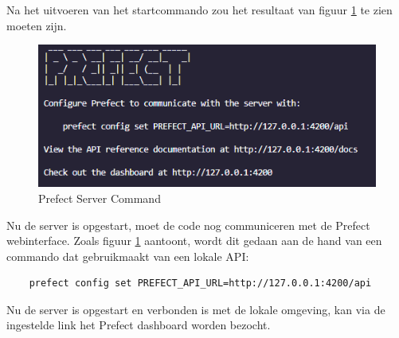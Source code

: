 Na het uitvoeren van het startcommando zou het resultaat van figuur \ref{fig:Prefect_server} te zien moeten zijn.
\begin{figure}[htbp]
    \centering
    \includegraphics[width=0.9\linewidth]{graphics/Prefect_server.PNG}
    \caption{Prefect Server Command}
    \label{fig:Prefect_server}
\end{figure}
Nu de server is opgestart, moet de code nog communiceren met de Prefect webinterface.
Zoals figuur \ref{fig:Prefect_server} aantoont, wordt dit gedaan aan de hand van een commando dat gebruikmaakt van een lokale API:
\begin{verbatim}
    prefect config set PREFECT_API_URL=http://127.0.0.1:4200/api
\end{verbatim}
Nu de server is opgestart en verbonden is met de lokale omgeving, kan via de ingestelde link het Prefect dashboard worden bezocht.
